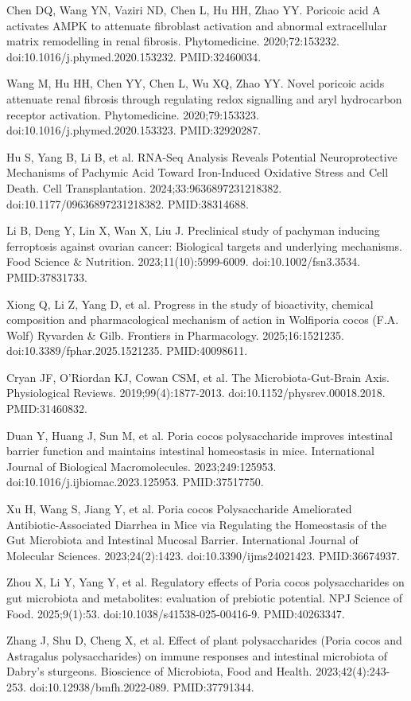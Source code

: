 \documentclass[11pt,oneside]{book}
\newcommand{\reff}[2]{\par\hangindent=7mm\hangafter=1\noindent[#1]\hspace{2mm}#2\par}
\begin{document}
\reff{10}{Chen DQ, Wang YN, Vaziri ND, Chen L, Hu HH, Zhao YY. Poricoic acid A activates AMPK to attenuate fibroblast activation and abnormal extracellular matrix remodelling in renal fibrosis. Phytomedicine. 2020;72:153232. doi:10.1016/j.phymed.2020.153232. PMID:32460034.}
\reff{11}{Wang M, Hu HH, Chen YY, Chen L, Wu XQ, Zhao YY. Novel poricoic acids attenuate renal fibrosis through regulating redox signalling and aryl hydrocarbon receptor activation. Phytomedicine. 2020;79:153323. doi:10.1016/j.phymed.2020.153323. PMID:32920287.}
\reff{12}{Hu S, Yang B, Li B, et al. RNA-Seq Analysis Reveals Potential Neuroprotective Mechanisms of Pachymic Acid Toward Iron-Induced Oxidative Stress and Cell Death. Cell Transplantation. 2024;33:9636897231218382. doi:10.1177/09636897231218382. PMID:38314688.}
\reff{13}{Li B, Deng Y, Lin X, Wan X, Liu J. Preclinical study of pachyman inducing ferroptosis against ovarian cancer: Biological targets and underlying mechanisms. Food Science \& Nutrition. 2023;11(10):5999-6009. doi:10.1002/fsn3.3534. PMID:37831733.}
\reff{14}{Xiong Q, Li Z, Yang D, et al. Progress in the study of bioactivity, chemical composition and pharmacological mechanism of action in Wolfiporia cocos (F.A. Wolf) Ryvarden \& Gilb. Frontiers in Pharmacology. 2025;16:1521235. doi:10.3389/fphar.2025.1521235. PMID:40098611.}
\reff{15}{Cryan JF, O'Riordan KJ, Cowan CSM, et al. The Microbiota-Gut-Brain Axis. Physiological Reviews. 2019;99(4):1877-2013. doi:10.1152/physrev.00018.2018. PMID:31460832.}
\reff{16}{Duan Y, Huang J, Sun M, et al. Poria cocos polysaccharide improves intestinal barrier function and maintains intestinal homeostasis in mice. International Journal of Biological Macromolecules. 2023;249:125953. doi:10.1016/j.ijbiomac.2023.125953. PMID:37517750.}
\reff{17}{Xu H, Wang S, Jiang Y, et al. Poria cocos Polysaccharide Ameliorated Antibiotic-Associated Diarrhea in Mice via Regulating the Homeostasis of the Gut Microbiota and Intestinal Mucosal Barrier. International Journal of Molecular Sciences. 2023;24(2):1423. doi:10.3390/ijms24021423. PMID:36674937.}
\reff{18}{Zhou X, Li Y, Yang Y, et al. Regulatory effects of Poria cocos polysaccharides on gut microbiota and metabolites: evaluation of prebiotic potential. NPJ Science of Food. 2025;9(1):53. doi:10.1038/s41538-025-00416-9. PMID:40263347.}
\reff{19}{Zhang J, Shu D, Cheng X, et al. Effect of plant polysaccharides (Poria cocos and Astragalus polysaccharides) on immune responses and intestinal microbiota of Dabry's sturgeons. Bioscience of Microbiota, Food and Health. 2023;42(4):243-253. doi:10.12938/bmfh.2022-089. PMID:37791344.}
\end{document}

